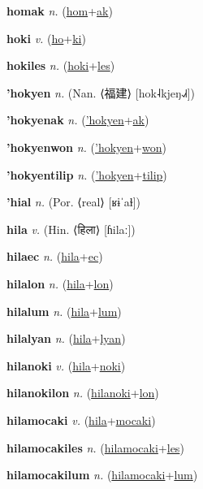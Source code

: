 \textbf{\hypertarget{homak}{homak}} \textit{n.} (\hyperlink{hom}{hom}+\allowbreak \hyperlink{ak}{ak})


\textbf{\hypertarget{hoki}{hoki}} \textit{v.} (\hyperlink{ho}{ho}+\allowbreak \hyperlink{ki}{ki})


\textbf{\hypertarget{hokiles}{hokiles}} \textit{n.} (\hyperlink{hoki}{hoki}+\allowbreak \hyperlink{les}{les})


\textbf{\hypertarget{'hokyen}{'hokyen}} \textit{n.} (Nan. ⟨{\chinese{}福建}⟩ [hok˨kjeŋ˨˩˧])


\textbf{\hypertarget{'hokyenak}{'hokyenak}} \textit{n.} (\hyperlink{'hokyen}{'hokyen}+\allowbreak \hyperlink{ak}{ak})


\textbf{\hypertarget{'hokyenwon}{'hokyenwon}} \textit{n.} (\hyperlink{'hokyen}{'hokyen}+\allowbreak \hyperlink{won}{won})


\textbf{\hypertarget{'hokyentilip}{'hokyentilip}} \textit{n.} (\hyperlink{'hokyen}{'hokyen}+\allowbreak \hyperlink{tilip}{tilip})


\textbf{\hypertarget{'hial}{'hial}} \textit{n.} (Por. ⟨real⟩ [ʁɨˈaɫ])


\textbf{\hypertarget{hila}{hila}} \textit{v.} (Hin. ⟨{\devanagari{}हिला}⟩ [ɦilaː])


\textbf{\hypertarget{hilaec}{hilaec}} \textit{n.} (\hyperlink{hila}{hila}+\allowbreak \hyperlink{ec}{ec})


\textbf{\hypertarget{hilalon}{hilalon}} \textit{n.} (\hyperlink{hila}{hila}+\allowbreak \hyperlink{lon}{lon})


\textbf{\hypertarget{hilalum}{hilalum}} \textit{n.} (\hyperlink{hila}{hila}+\allowbreak \hyperlink{lum}{lum})


\textbf{\hypertarget{hilalyan}{hilalyan}} \textit{n.} (\hyperlink{hila}{hila}+\allowbreak \hyperlink{lyan}{lyan})


\textbf{\hypertarget{hilanoki}{hilanoki}} \textit{v.} (\hyperlink{hila}{hila}+\allowbreak \hyperlink{noki}{noki})


\textbf{\hypertarget{hilanokilon}{hilanokilon}} \textit{n.} (\hyperlink{hilanoki}{hilanoki}+\allowbreak \hyperlink{lon}{lon})


\textbf{\hypertarget{hilamocaki}{hilamocaki}} \textit{v.} (\hyperlink{hila}{hila}+\allowbreak \hyperlink{mocaki}{mocaki})


\textbf{\hypertarget{hilamocakiles}{hilamocakiles}} \textit{n.} (\hyperlink{hilamocaki}{hilamocaki}+\allowbreak \hyperlink{les}{les})


\textbf{\hypertarget{hilamocakilum}{hilamocakilum}} \textit{n.} (\hyperlink{hilamocaki}{hilamocaki}+\allowbreak \hyperlink{lum}{lum})


